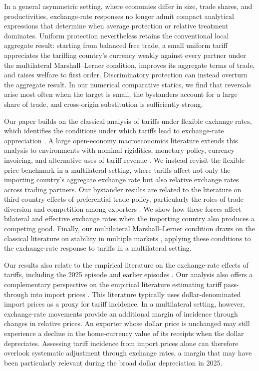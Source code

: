 In a general asymmetric setting, where economies differ in size, trade shares, and productivities, exchange-rate responses no longer admit compact analytical expressions that determine when average protection or relative treatment dominates. Uniform protection nevertheless retains the conventional local aggregate result: starting from balanced free trade, a small uniform tariff appreciates the tariffing country's currency weakly against every partner under the multilateral Marshall--Lerner condition, improves its aggregate terms of trade, and raises welfare to first order. Discriminatory protection can instead overturn the aggregate result. In our numerical comparative statics, we find that reversals arise most often when the target is small, the bystanders account for a large share of trade, and cross-origin substitution is sufficiently strong.

Our paper builds on the classical analysis of tariffs under flexible exchange rates, which identifies the conditions under which tariffs lead to exchange-rate appreciation \citep{lerner1936,metzler1949,mundell1961,dornbusch1974,eichengreen1981,krugman1982}. A large open-economy macroeconomics literature extends this analysis to environments with nominal rigidities, monetary policy, currency invoicing, and alternative uses of tariff revenue \citep{linde2019,barattieri2021,erceg2023,bergin2023,werning2025}. We instead revisit the flexible-price benchmark in a multilateral setting, where tariffs affect not only the importing country's aggregate exchange rate but also relative exchange rates across trading partners. Our bystander results are related to the literature on third-country effects of preferential trade policy, particularly the roles of trade diversion and competition among exporters \citep{viner1950,mundell1964,bond1996,bagwell1999,bagwell2002}. We show how these forces affect bilateral and effective exchange rates when the importing country also produces a competing good. Finally, our multilateral Marshall--Lerner condition draws on the classical literature on stability in multiple markets \citep{hicks1939,mosak1944,metzler1945,arrow1958}, applying these conditions to the exchange-rate response to tariffs in a multilateral setting.

Our results also relate to the empirical literature on the exchange-rate effects of tariffs, including the 2025 episode \citep{itskhoki2025,kalemliozcan2026,ostry2025} and earlier episodes \citep{furceri2019,matveev2021,jeanne2024}. Our analysis also offers a complementary perspective on the empirical literature estimating tariff pass-through into import prices \citep{amiti2019,fajgelbaum2020,cavallo2021}. This literature typically uses dollar-denominated import prices as a proxy for tariff incidence. In a multilateral setting, however, exchange-rate movements provide an additional margin of incidence through changes in relative prices. An exporter whose dollar price is unchanged may still experience a decline in the home-currency value of its receipts when the dollar depreciates. Assessing tariff incidence from import prices alone can therefore overlook systematic adjustment through exchange rates, a margin that may have been particularly relevant during the broad dollar depreciation in 2025.

